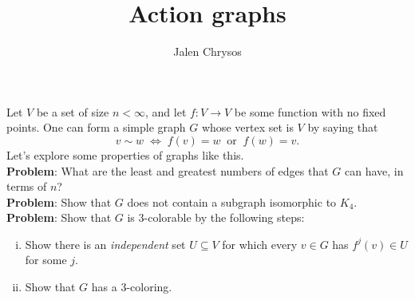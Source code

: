 \documentclass{amsart}
\author{Jalen Chrysos}
\title{Action graphs}
\begin{document}
	\maketitle 
	
	Let $V$ be a set of size $n<\infty$, and let $f:V\to V$ be some function with no fixed points. One can form a simple graph $G$ whose vertex set is $V$ by saying that 
	$$
	v\sim w \; \iff \; f(v) = w \;\; \text{or} \;\; f(w)=v.
	$$
	Let's explore some properties of graphs like this.\\
	
	\noindent \textbf{Problem}: What are the least and greatest numbers of edges that $G$ can have, in terms of $n$?\\
	
	\noindent \textbf{Problem}: Show that $G$ does not contain a subgraph isomorphic to $K_4$.\\
	
	\noindent \textbf{Problem}: Show that $G$ is 3-colorable by the following steps:
	\begin{enumerate}[(i)]
		\item Show there is an \textit{independent} set $U\subseteq V$ for which every $v\in G$ has $f^j(v)\in U$ for some $j$.
		\item Show that $G$ has a 3-coloring.
	\end{enumerate}
\end{document}
